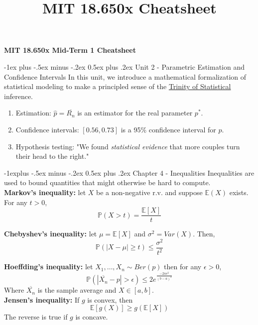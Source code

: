 \documentclass[9pt,landscape]{article}
\title{MIT 18.650x Cheatsheet}
\makeatletter
\renewcommand{\section}{\@startsection{section}{1}{0mm}%
                                {-1ex plus -.5ex minus -.2ex}%
                                {0.5ex plus .2ex}%
                                {\normalfont\large\bfseries}}
\renewcommand{\subsection}{\@startsection{subsection}{2}{0mm}%
                                {-1explus -.5ex minus -.2ex}%
                                {0.5ex plus .2ex}%
                                {\normalfont\normalsize\bfseries}}
\makeatother
\begin{document}
\raggedright
\footnotesize

\begin{center}
    \textbf{MIT 18.650x Mid-Term 1 Cheatsheet}\\
\end{center}
\begin{multicols}{3}
\setlength{\premulticols}{1pt}
\setlength{\postmulticols}{1pt}
\setlength{\multicolsep}{1pt}
\setlength{\columnsep}{1pt}

\section{Unit 2 - Parametric Estimation and Confidence Intervals}
In this unit, we introduce a mathematical formalization of statistical modeling to make a principled sense of the \underline{Trinity of Statistical} inference.

\begin{enumerate}
    \item {Estimation: $\hat{p} = \overline{R_n}$ is an estimator for the real parameter $p^*$.}
    \item {Confidence intervals: $[0.56, 0.73]$ is a 95\% confidence interval for $p$.}
    \item {Hypothesis testing: "We found \textit{statistical evidence} that more couples turn their head to the right."}
\end{enumerate}

\subsection{Chapter 4 - Inequalities}
Inequalities are used to bound quantities that might otherwise be hard to compute. \\

\textbf{Markov's inequality:} let $X$ be a non-negative r.v. and suppose $\mathbb{E}(X)$ exists. For any $t > 0$,
$$\mathbb{P}(X > t) = \frac{\mathbb{E}[X]}{t}$$

\textbf{Chebyshev's inequality:} let $\mu = \mathbb{E}[X]$ and $\sigma^2 = Var(X)$. Then, $$\mathbb{P}(|X - \mu| \ge t) \leq \frac{\sigma^2}{t^2}$$

\textbf{Hoeffding's inequality:} let $X_1, \dots, X_n \sim{} Ber(p)$ then for any $\epsilon > 0$, $$\mathbb{P}(|\overline{X_n} - p| > \epsilon) \leq 2e^{\frac{-2n\epsilon^2}{(b-a)^2}}$$
Where $\overline{X_n}$ is the sample average and $X \in [a, b]$.\\

\textbf{Jensen's inequality:} If $g$ is convex, then $$\mathbb{E}[g(X)] \ge g(\mathbb{E}[X])$$
The reverse is true if $g$ is concave.


\end{multicols}
\end{document}

